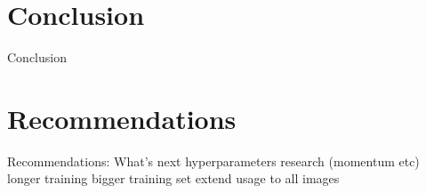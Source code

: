 \section{Conclusion}


Conclusion


\section{Recommendations}

Recommendations: What's next
hyperparameters research (momentum etc)
longer training
bigger training set
extend usage to all images
